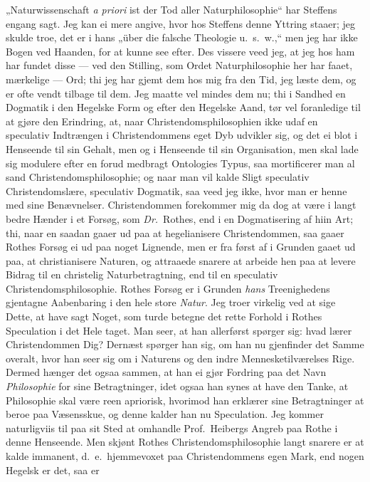\documentclass[12pt,a4paper]{book}
\newcommand{\apage}[1]{\marginnote{\footnotesize\textit{[#1]}}}
\begin{document}
„Naturwissenschaft \textit{a priori} ist der Tod aller Naturphilosophie“ har Steffens
engang sagt. Jeg kan ei mere angive, hvor hos Steffens denne Yttring staaer;
jeg skulde troe, det er i hans „über die falsche Theologie u.\ s.\ w.,“ men
jeg har ikke Bogen ved Haanden, for at kunne see efter. Des vissere veed jeg,
at jeg hos ham har fundet disse --- ved den Stilling, som Ordet
Naturphilosophie her har faaet, mærkelige --- Ord; thi jeg har gjemt dem hos
mig fra den Tid, jeg læste dem, og er ofte vendt tilbage til dem. Jeg maatte
vel mindes dem nu; thi i Sandhed en Dogmatik i den Hegelske Form og efter
den Hegelske Aand, tør \apage{27} vel foranledige til at gjøre den Erindring, at, naar
Christendomsphilosophien ikke udaf en speculativ Indtrængen i
Christendommens eget Dyb udvikler sig, og det ei blot i Henseende til sin
Gehalt, men og i Henseende til sin Organisation, men skal lade sig modulere
efter en forud medbragt Ontologies Typus, saa mortificerer man al sand
Christendomsphilosophie; og naar man vil kalde Sligt speculativ
Christendomslære, speculativ Dogmatik, saa veed jeg ikke, hvor man er henne
med sine Benævnelser. Christendommen forekommer mig da dog at være i langt
bedre Hænder i et Forsøg, som \textit{Dr.}\ Rothes, end i en Dogmatisering af hiin
Art; thi, naar en saadan gaaer ud paa at hegelianisere Christendommen, saa
gaaer Rothes Forsøg ei ud paa noget Lignende, men er fra først af i Grunden
gaaet ud paa, at christianisere Naturen, og attraaede snarere at arbeide hen
paa at levere Bidrag til en christelig Naturbetragtning, end til en
speculativ Christendomsphilosophie. Rothes Forsøg er i Grunden \emph{\emph{hans}}
Treenighedens gjentagne Aabenbaring i den hele store \emph{Natur}. Jeg troer
virkelig ved at sige Dette, at have sagt Noget, som turde betegne det rette
Forhold i Rothes Speculation i det Hele taget. Man seer, at han allerførst
spørger sig: hvad lærer Christendommen Dig? Dernæst spørger han sig, om han
nu gjenfinder det Samme overalt, hvor han seer sig om i Naturens og den
indre Mennesketilværelses Rige. Dermed hænger det ogsaa sammen, at han ei
gjør Fordring paa det Navn \emph{Philosophie} for sine Betragtninger, idet ogsaa
han synes at have den Tanke, at Philosophie skal være reen apriorisk,
hvorimod han erklærer sine Betragtninger at beroe paa Væsensskue, og denne
kalder han nu Speculation. Jeg kommer naturligviis til paa sit Sted at
omhandle Prof.\ Heibergs Angreb paa Rothe i denne Henseende. Men skjønt
Rothes Christendomsphilosophie langt snarere er at kalde immanent, d.\ e.\
hjemmevoxet paa Christendommens egen Mark, end nogen Hegelsk er det, saa er
\end{document}
